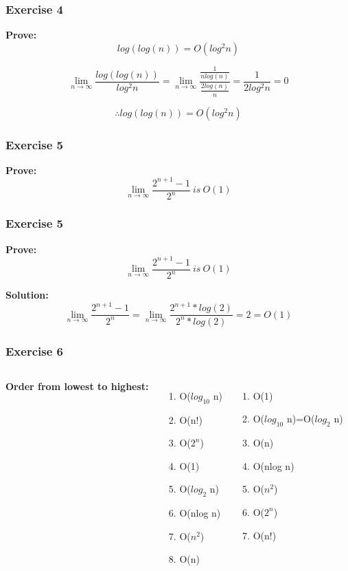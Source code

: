 \documentclass{beamer}
\begin{document}
 \begin{frame}[noframenumbering]
 \frametitle{Exercise 4}
\textbf{Prove:} $$log(log(n))=O(log^{2}n)$$

 
  $$\lim_{n \to \infty} \frac{log(log(n))}{log^{2}n}=\lim_{n \to \infty} \frac{\frac{1}{nlog(n)}}{\frac{2log(n)}{n}} = \frac{1}{2log^{2}n}=0$$
 

$$\therefore log(log(n))=O(log^{2}n)$$
 
\end{frame}

\begin{frame} 
 \frametitle{Exercise 5}
\textbf{Prove:}  $$\lim_{n \to \infty}    \frac{2^{n+1} - 1}{2^{n}}  \ is \  O(1)$$   
\end{frame}

\begin{frame}[noframenumbering]
 \frametitle{Exercise 5}
\textbf{Prove:}  $$\lim_{n \to \infty}    \frac{2^{n+1} - 1}{2^{n}}  \ is \  O(1)$$  

\textbf{Solution:}  $$\lim_{n \to \infty}    \frac{2^{n+1} - 1}{2^{n}} =\lim_{n \to \infty}   \frac{2^{n+1} * log(2)}{2^{n}*log(2)}=2 = O(1) $$\end{frame}

\begin{frame}
\frametitle{Exercise 6}
\begin{columns}[c] %

\textbf{Order from lowest to highest: }
\begin{enumerate}[I]
\item O($log_{10}$ n)
\item  O(n!) 
\item O($2^{n}$) 
\item O(1) 
\item O($log_{2}$ n) 
\item O(nlog n) 
\item O($n^{2}$) 
\item O(n)
\end{enumerate}

\begin{enumerate}

\item   O(1) 
\pause
\item O($log_{10}$ n)=O($log_{2}$ n)
\pause
\item   O(n) 
\pause
\item  O(nlog n) 
\pause
\item  O($n^{2}$)  
\pause
\item  O($2^{n}$)
\pause
\item  O(n!)
\end{enumerate}
\end{columns}
\end{frame}
\end{document}

